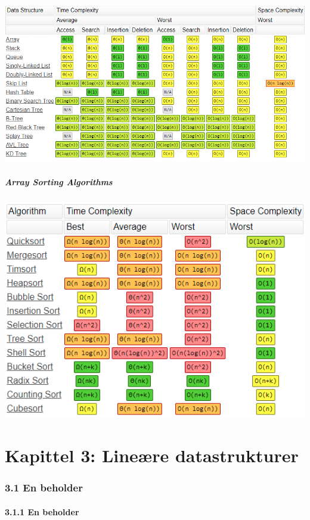 \documentclass[11pt]{article}
\begin{document}
            \includegraphics[scale=0.8]{common_ds_ops-new.png}

        \subsubsection{Array Sorting Algorithms}

            \includegraphics[center]{array_sorting_algs-new.png}

\newpage
\setcounter{part}{2}
\part{Kapittel 3: Lineære datastrukturer}
\section{3.1 En beholder}
    \subsection{3.1.1 En beholder}
\end{document}
